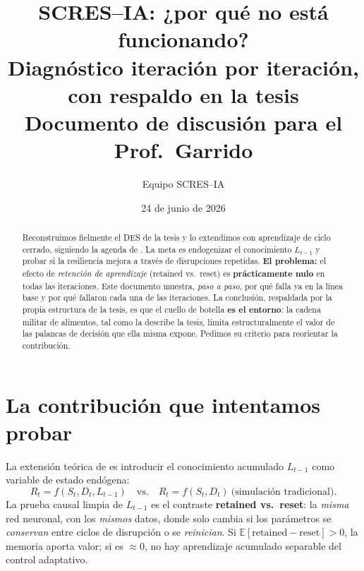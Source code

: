 \documentclass[11pt,a4paper]{article}
\title{\textbf{SCRES--IA: ¿por qué no está funcionando?}\\[2pt]
\large Diagnóstico iteración por iteración, con respaldo en la tesis\\
\normalsize Documento de discusión para el Prof.\ Garrido}
\author{Equipo SCRES--IA}
\date{24 de junio de 2026}
\newcommand{\bad}[1]{\textcolor{red!60!black}{\textbf{#1}}}
\begin{document}
\maketitle

\begin{abstract}
\noindent Reconstruimos fielmente el DES de la tesis \cite{tesis2017} y lo extendimos
con aprendizaje de ciclo cerrado, siguiendo la agenda de \cite{garrido2024}. La meta es
endogenizar el conocimiento $L_{t-1}$ y probar si la resiliencia mejora a través de
disrupciones repetidas. \textbf{El problema:} el efecto de \emph{retención de
aprendizaje} (retained vs.\ reset) es \bad{prácticamente nulo} en todas las iteraciones.
Este documento muestra, \emph{paso a paso}, por qué falla ya en la línea base y por qué
fallaron cada una de las iteraciones. La conclusión, respaldada por la propia estructura
de la tesis, es que el cuello de botella \textbf{es el entorno}: la cadena militar de
alimentos, tal como la describe la tesis, limita estructuralmente el valor de las
palancas de decisión que ella misma expone. Pedimos su criterio para reorientar la
contribución.
\end{abstract}

\section{La contribución que intentamos probar}
La extensión teórica de \cite{garrido2024} es introducir el conocimiento acumulado
$L_{t-1}$ como variable de estado endógena:
\[
R_t = f(S_t, D_t, L_{t-1}) \quad\text{vs.}\quad R_t = f(S_t, D_t)\ \text{(simulación tradicional)}.
\]
La prueba causal limpia de $L_{t-1}$ es el contraste \textbf{retained vs.\ reset}: la
\emph{misma} red neuronal, con los \emph{mismos} datos, donde solo cambia si los
parámetros se \emph{conservan} entre ciclos de disrupción o se \emph{reinician}. Si
$\mathbb{E}[\text{retained}-\text{reset}]>0$, la memoria aporta valor; si es $\approx 0$,
no hay aprendizaje acumulado separable del control adaptativo.
\end{document}
